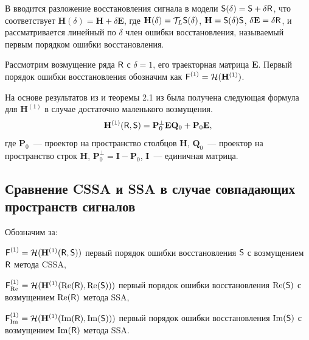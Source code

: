 \documentclass[specialist,
               substylefile = spbu.rtx,
               subf,href,colorlinks=true, 12pt]{disser}
\begin{document}
В \cite{Nekrutkin} вводится разложение восстановления сигнала в модели $\textsf{S}(\delta) = \textsf{S} + \delta \textsf{R}$, что соответствует $\mathbf{H}(\delta) = \mathbf{H} + \delta \mathbf{E}$, где $\mathbf{H}(\delta) = \mathcal{T}_L \textsf{S}(\delta)$, $\mathbf{H} = \textsf{S}(\delta)\textsf{S}$, $\delta\mathbf{E} = \delta \textsf{R}$, и рассматривается линейный по $\delta$ член ошибки восстановления, называемый первым порядком ошибки восстановления.

Рассмотрим возмущение ряда $\textsf{R}$ с $\delta = 1$, его траекторная матрица $\mathbf{E}$. Первый порядок ошибки восстановления обозначим как $\textsf{F}^{(1)} = \mathcal{H}(\mathbf{H}^{(1)})$.

На основе результатов из \cite[стр.12]{Konstantinov} и теоремы 2.1 из \cite{Nekrutkin} была получена следующая формула для $\mathbf{H}^{(1)}$ в случае достаточно маленького возмущения.
\begin{equation} \label{eq:main}
	\mathbf{H}^{(1)}(\textsf{R}, \textsf{S}) = \mathbf{P}^{\perp}_0 \mathbf{E} \mathbf{Q}_0 + \mathbf{P}_0 \mathbf{E},
\end{equation}
где $\mathbf{P}_0$~--- проектор на пространство столбцов $\mathbf{H}$, $\mathbf{Q}_0$~--- проектор на пространство строк $\mathbf{H}$, $\mathbf{P}^{\perp}_0 = \mathbf{I} - \mathbf{P}_0$, $\mathbf{I}$~--- единичная матрица.


\subsection{Сравнение CSSA и SSA в случае совпадающих пространств сигналов}

Обозначим за:

$\textsf{F}^{(1)} = \mathcal{H}(\mathbf{H}^{(1)}(\textsf{R}, \textsf{S}))$ первый порядок ошибки восстановления $\textsf{S}$ с возмущением $\textsf{R}$ метода CSSA,

$\textsf{F}^{(1)}_{\Re} = \mathcal{H}(\mathbf{H}^{(1)}(\Re(\textsf{R}), \Re(\textsf{S})))$ первый порядок ошибки восстановления $\Re(\textsf{S})$ с возмущением $\Re(\textsf{R})$ метода SSA,

$\textsf{F}^{(1)}_{\Im} = \mathcal{H}(\mathbf{H}^{(1)}(\Im(\textsf{R}), \Im(\textsf{S})))$ первый порядок ошибки восстановления $\Im(\textsf{S})$ с возмущением $\Im(\textsf{R})$ метода SSA.
\end{document}
